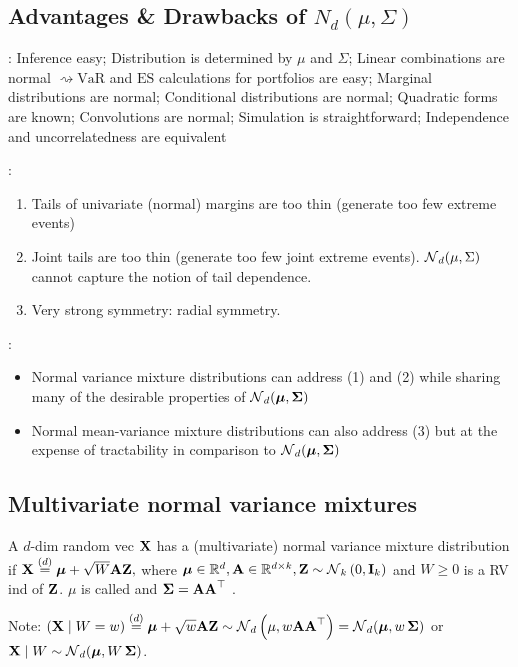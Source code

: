 \subsection*{Advantages \& Drawbacks of $N_{d}(\mu, \Sigma)$}
: Inference easy; Distribution is determined by $\mu$ and $\Sigma$; Linear combinations are normal $\rightsquigarrow \mathrm{VaR}$ and $\mathrm{ES}$ calculations for portfolios are easy; Marginal distributions are normal; Conditional distributions are normal; Quadratic forms are known; Convolutions are normal; Simulation is straightforward; Independence and uncorrelatedness are equivalent

:
\begin{enumerate}[label = (\arabic*), leftmargin=*]
    \item Tails of univariate (normal) margins are too thin (generate too few extreme events)
    \item Joint tails are too thin (generate too few joint extreme events). $\operatorname{\mathcal{N}}_{d}(\mu, \Sigma)$ cannot capture the notion of tail dependence.
    \item Very strong symmetry: radial symmetry.
\end{enumerate}


:
\begin{itemize}[leftmargin=*]
    \item Normal variance mixture distributions can address (1) and (2) while sharing many of the desirable properties of $\operatorname{\mathcal{N}}_{d}(\operatorname{\boldsymbol{\mathbf{\mu}}}, \operatorname{\boldsymbol{\mathbf{\Sigma}}})$
    \item Normal mean-variance mixture distributions can also address (3) but at the expense of tractability in comparison to $\operatorname{\mathcal{N}}_{d}(\operatorname{\boldsymbol{\mathbf{\mu}}}, \operatorname{\boldsymbol{\mathbf{\Sigma}}})$
\end{itemize}


\subsection*{Multivariate normal variance mixtures}
A $d$-dim random vec $\boldsymbol{\mathbf{X}}$ has a (multivariate) normal variance mixture distribution if
$
\boldsymbol{\mathbf{X}} \stackrel{(d)}{=} \boldsymbol{\mathbf{\mu}}+\sqrt{W} \boldsymbol{\mathbf{AZ}},
$
where $\boldsymbol{\mathbf{\mu}} \in \mathbb{R}^{d}, \boldsymbol{\mathbf{A}} \in \mathbb{R}^{d \times k}, \boldsymbol{\mathbf{Z}} \sim \operatorname{\mathcal{N}}_{k}\left(0, \boldsymbol{\mathbf{I}}_{k}\right)$ and $W \geq 0$ is a RV ind of $\boldsymbol{\mathbf{Z}}$. $\mu$ is called  and $\operatorname{\boldsymbol{\mathbf{\Sigma}}}=\boldsymbol{\mathbf{AA}}^{\operatorname{\top}}$ .

Note:
$
(\boldsymbol{\mathbf{X}} \mid W=w) \stackrel{(d)}{=} \boldsymbol{\mathbf{\mu}}+\sqrt{w} \boldsymbol{\mathbf{A Z}} \sim \operatorname{\mathcal{N}}_{d}\left(\mu, w \boldsymbol{\mathbf{AA}}^{\operatorname{\top}}\right)=\operatorname{\mathcal{N}}_{d}(\operatorname{\boldsymbol{\mathbf{\mu}}}, w \operatorname{\boldsymbol{\mathbf{\Sigma}}})
$
or
$
\boldsymbol{\mathbf{X}} \mid W \sim \operatorname{\mathcal{N}}_{d}(\operatorname{\boldsymbol{\mathbf{\mu}}}, W \operatorname{\boldsymbol{\mathbf{\Sigma}}})
$.

